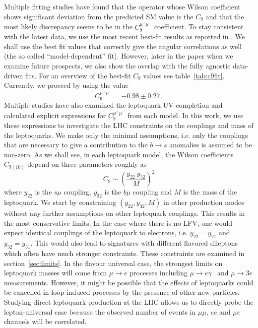 \documentclass[12pt]{revtex4-2}
\numberwithin{equation}{section}
\newcommand{\ytt}{y_{22}}
\newcommand{\yth}{y_{32}}
\begin{document}
Multiple fitting studies have found that the operator whose Wilson coefficient shows significant deviation from the predicted SM value is the $C_9$  and that the most likely discrepancy seems to be in the $C_9^{\mu^+ \mu^-}$ coefficient.  To stay consistent with the latest data, we use the most recent best-fit results as reported in \cite{Ciuchini:2022wbq}.  We shall use the best fit values that correctly give the angular correlations as well (the so called ``model-dependent'' fit).  However, later in the paper when we examine future prospects, we also show the overlap with the fully agnostic data-driven fits. For an overview of the best-fit $C_9$ values see table~\ref{tab:c9fit}.  Currently, we proceed by using the value
\[
C_9^{\mu^+ \mu^-} = -0.98 \pm 0.27,
\]
Multiple studies  have also examined the leptoquark UV completion and calculated explicit expressions for $C_9^{\mu^+ \mu^-}$ from each model.  In this work, we use these expressions to investigate the LHC constraints on the couplings and mass of the leptoquarks.  We make only the minimal assumptions, i.e. only the couplings that are necessary to give a contribution to the $b \rightarrow s$ anomalies is assumed to be non-zero.  As we shall see, in each leptoquark model, the Wilson coefficients $C_{9(10)}$ depend on three parameters roughly as 
\[
C_{9} \sim \left(\frac{\ytt~\yth}{M}\right)^2
\]
where $\ytt$ is the $s\mu$ coupling, $\yth$ is the $b\mu$ coupling and $M$ is the mass of the leptoquark.  We start by constraining $(\ytt, \yth, M)$ in other production modes without any further assumptions on other leptoquark couplings.  This results in the most conservative limits.  In the case where there is no LFV, one would expect identical couplings of the leptoquark to electrons, i.e. $y_{22} = y_{21}$ and $y_{32} = y_{31}$.  This would also lead to signatures with different flavored dileptons which often have much stronger constraints.  These constraints are examined in section~\ref{sec:limits}.  In the flavour universal case, the strongest limits on leptoquark masses will come from $\mu \rightarrow e$ processes including $\mu \rightarrow e \gamma$~\cite{MEG:2013oxv} and $\mu \rightarrow 3e$\cite{SINDRUM:1987nra} measurements.  However, it might be possible that the effects of leptoquarks could be cancelled in loop-induced processes by the presence of other new particles.  Studying direct leptoquark production at the LHC allows us to directly probe the lepton-universal case because the observed number of events in $\mu \mu$, $ee$ and $\mu e$ channels will be correlated.
\end{document}
